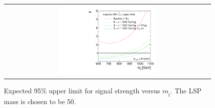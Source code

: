 \begin{figure}[!h]
  \centering
  \begin{tabular}{c}
                \includegraphics[width=0.49\textwidth]{figures/limitplot4BinSel_BaselineBTagTopTagTransverseMass.pdf} 
  \end{tabular}
  \caption{Expected 95\% upper limit for signal strength versus $m_{\tilde{t}}$. The LSP mass is chosen to be 50\gev.}
  \label{fig:stop_baselinetoptag_limit}
\end{figure}

